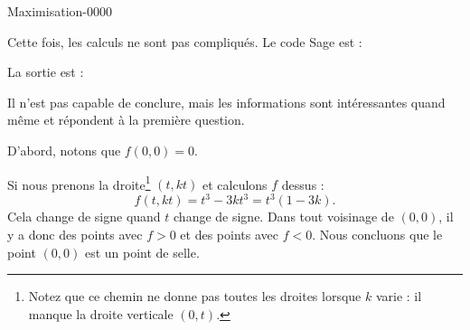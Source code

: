 
\begin{corrige}{Maximisation-0000}

	Cette fois, les calculs ne sont pas compliqués. Le code Sage est :


	La sortie est :


	Il n'est pas capable de conclure, mais les informations sont intéressantes quand même et répondent à la première question.

	D'abord, notons que $f(0,0)=0$.

	Si nous prenons la droite\footnote{Notez que ce chemin ne donne pas toutes les droites lorsque $k$ varie : il manque la droite verticale $(0,t)$.} $(t,kt)$ et calculons $f$ dessus :
	\begin{equation}
		f(t,kt)=t^3-3kt^3=t^3(1-3k).
	\end{equation}
	Cela change de signe quand $t$ change de signe. Dans tout voisinage de $(0,0)$, il y a donc des points avec $f>0$ et des points avec $f<0$. Nous concluons que le point $(0,0)$ est un point de selle.

\end{corrige}
